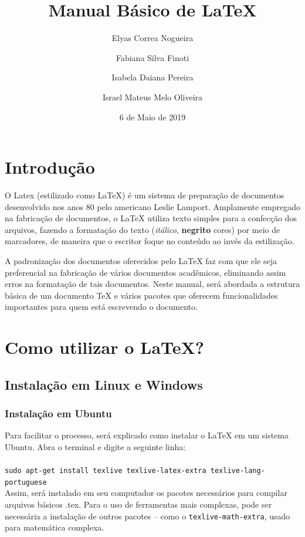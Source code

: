 \documentclass[12pt]{article}
\title{Manual Básico de LaTeX}
\author{
	Elyas Correa Nogueira\\
	\and
	Fabiana Silva Finoti\\
	\and
	Isabela Daiana Pereira\\
	\and
	Israel Mateus Melo Oliveira\\	
}
\date{6 de Maio de 2019}
\begin{document}
	
	\maketitle
	
	\newpage
	
	\section{Introdução}
		O Latex (estilizado como \LaTeX) é um sistema de preparação de documentos desenvolvido nos anos 80 pelo americano Leslie Lamport. Amplamente empregado na fabricação de documentos, o LaTeX utiliza texto simples para a confecção dos arquivos, fazendo a formatação do texto (\textit{itálico}, \textbf{negrito} {\color{red} cores}) por meio de marcadores, de maneira que o escritor foque no conteúdo ao invés da estilização.
	
		A padronização dos documentos oferecidos pelo LaTeX faz com que ele seja preferencial na fabricação de vários documentos acadêmicos, eliminando assim erros na formatação de tais documentos. Neste manual, será abordada a estrutura básica de um documento TeX e vários pacotes que oferecem funcionalidades importantes para quem está escrevendo o documento.
	
	\section{Como utilizar o LaTeX?}
	
		\subsection{Instalação em Linux e Windows}
		
			\subsubsection{Instalação em Ubuntu}
				Para facilitar o processo, será explicado como instalar o LaTeX em um sistema Ubuntu. Abra o terminal e digite a seguinte linha:\\\\
				\texttt{sudo apt-get install texlive texlive-latex-extra texlive-lang-portuguese}\\
			
				Assim, será instalado em seu computador os pacotes necessários para compilar arquivos básicos .tex. Para o uso de ferramentas mais complexas, pode ser necessária a instalação de outros pacotes -- como o \texttt{texlive-math-extra}, usado para matemática complexa. 
			
\end{document}
